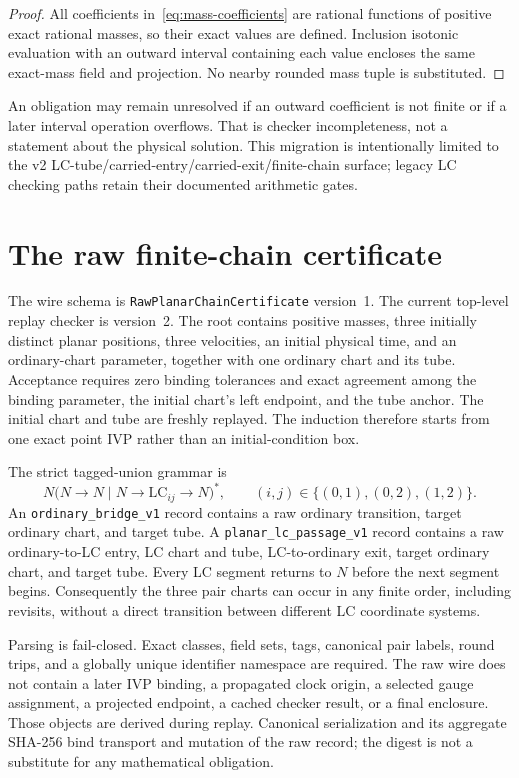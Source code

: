 \documentclass[11pt]{article}
\newcommand{\LC}{\mathrm{LC}}
\begin{document}
\begin{proof}
All coefficients in~\eqref{eq:mass-coefficients} are rational functions of
positive exact rational masses, so their exact values are defined.  Inclusion
isotonic evaluation with an outward interval containing each value encloses
the same exact-mass field and projection.  No nearby rounded mass tuple is
substituted.
\end{proof}

An obligation may remain unresolved if an outward coefficient is not finite
or if a later interval operation overflows.  That is checker incompleteness,
not a statement about the physical solution.  This migration is intentionally
limited to the v2 LC-tube/carried-entry/carried-exit/finite-chain surface;
legacy LC checking paths retain their documented arithmetic gates.

\section{The raw finite-chain certificate}
\label{sec:grammar}

The wire schema is \texttt{RawPlanarChainCertificate} version~1.  The current
top-level replay checker is version~2.  The root contains positive masses,
three initially distinct planar positions, three velocities, an initial
physical time, and an ordinary-chart parameter, together with one ordinary
chart and its tube.  Acceptance requires zero binding tolerances and exact
agreement among the binding parameter, the initial chart's left endpoint,
and the tube anchor.  The initial chart and tube are freshly replayed.  The
induction therefore starts from one exact point IVP rather than an
initial-condition box.

The strict tagged-union grammar is
\begin{equation}
 N\bigl(N\to N\mid N\to\LC_{ij}\to N\bigr)^*,
 \qquad (i,j)\in\{(0,1),(0,2),(1,2)\}.
 \label{eq:grammar}
\end{equation}
An \texttt{ordinary\_bridge\_v1} record contains a raw ordinary transition,
target ordinary chart, and target tube.  A
\texttt{planar\_lc\_passage\_v1} record contains a raw ordinary-to-LC entry,
LC chart and tube, LC-to-ordinary exit, target ordinary chart, and target
tube.  Every LC segment returns to $N$ before the next segment begins.
Consequently the three pair charts can occur in any finite order, including
revisits, without a direct transition between different LC coordinate
systems.

Parsing is fail-closed.  Exact classes, field sets, tags, canonical pair
labels, round trips, and a globally unique identifier namespace are required.
The raw wire does not contain a later IVP binding, a propagated clock origin,
a selected gauge assignment, a projected endpoint, a cached checker result,
or a final enclosure.  Those objects are derived during replay.  Canonical
serialization and its aggregate SHA-256 bind transport and mutation of the
raw record; the digest is not a substitute for any mathematical obligation.
\end{document}
